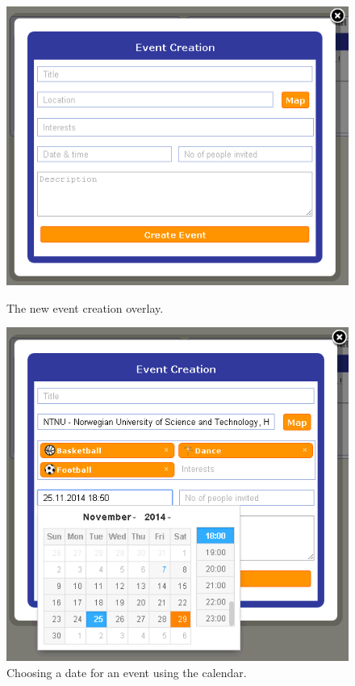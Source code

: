 \begin{figure}
\begin{minipage}{0.45\linewidth}
  \centering
  \includegraphics[width=\linewidth]{./img/webpage/3Nov/EventCreateBlank}
  \caption{The new event creation overlay.}
  \label{fig:S5DesignImplEventCreateBlank}
\end{minipage}%
\hspace{0.1\linewidth}
\begin{minipage}{0.45\linewidth}
  \centering
  \includegraphics[width=\linewidth]{./img/webpage/3Nov/EventCreateCalendar}
  \caption{Choosing a date for an event using the calendar.}
  \label{fig:S5DesignImplEventCreateCalendar}
\end{minipage}
\end{figure}

